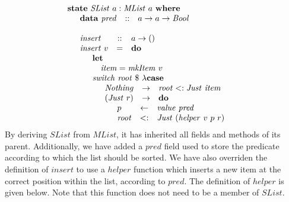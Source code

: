 \begin{displaymath}
\begin{array}{l}
\mathbf{state}~\mathit{SList}~a : \mathit{MList}~a~\mathbf{where} \\
\quad \begin{array}{lcl}
\mathbf{data}~\mathit{pred}  & :: & a \to a \to \mathit{Bool}
\end{array}\\\\
\quad \begin{array}{lcl}
\mathit{insert} & :: & a \to ()\\
\mathit{insert}~v & = & \mathbf{do} \\
\multicolumn{3}{l}{\quad \begin{array}{lcl}
    \multicolumn{3}{l}{\mathbf{let}}\\
    \multicolumn{3}{l}{\quad \mathit{item} = \mathit{mkItem}~v} \\
    \multicolumn{3}{l}{\mathit{switch}~\mathit{root}~\$~\lambda \mathbf{case}} \\
    \multicolumn{3}{l}{\quad \begin{array}{lcl}
        \mathit{Nothing} & \to & \mathit{root} <: \mathit{Just}~\mathit{item}  \\
        (\mathit{Just}~r) & \to & \mathbf{do} \\
        \multicolumn{3}{l}{\quad \begin{array}{lcl}
            p & \leftarrow & \mathit{value}~\mathit{pred} \\
            \mathit{root} & <: & \mathit{Just}~(\mathit{helper}~v~p~r) 
            \end{array}}
        \end{array}}
    \end{array}}
\end{array}
\end{array}
\end{displaymath}
By deriving $\mathit{SList}$ from $\mathit{MList}$, it has inherited all fields and methods of its parent. Additionally, we have added a $\mathit{pred}$ field used to store the predicate according to which the list should be sorted. We have also overriden the definition of $\mathit{insert}$ to use a $\mathit{helper}$ function which inserts a new item at the correct position within the list, according to $\mathit{pred}$. The definition of $\mathit{helper}$ is given below. Note that this function does not need to be a member of $\mathit{SList}$.
